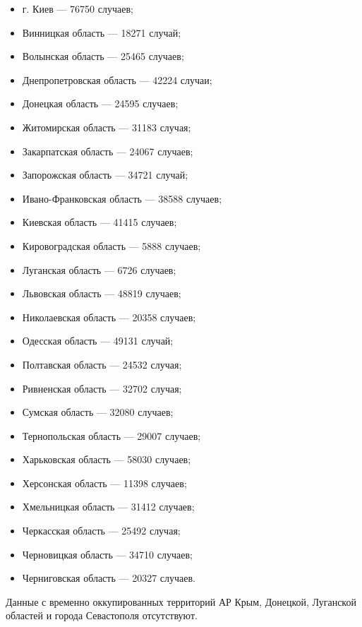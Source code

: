 \begin{itemize}
  \item г. Киев --- 76750 случаев;
  \item Винницкая область --- 18271 случай;
  \item Волынская область --- 25465 случаев;
  \item Днепропетровская область --- 42224 случаи;
  \item Донецкая область --- 24595 случаев;
  \item Житомирская область --- 31183 случая;
  \item Закарпатская область --- 24067 случаев;
  \item Запорожская область --- 34721 случай;
  \item Ивано-Франковская область --- 38588 случаев;
  \item Киевская область --- 41415 случаев;
  \item Кировоградская область --- 5888 случаев;
  \item Луганская область --- 6726 случаев;
  \item Львовская область --- 48819 случаев;
  \item Николаевская область --- 20358 случаев;
  \item Одесская область --- 49131 случай;
  \item Полтавская область --- 24532 случая;
  \item Ривненская область --- 32702 случая;
  \item Сумская область --- 32080 случаев;
  \item Тернопольская область --- 29007 случаев;
  \item Харьковская область --- 58030 случаев;
  \item Херсонская область --- 11398 случаев;
  \item Хмельницкая область --- 31412 случаев;
  \item Черкасская область --- 25492 случая;
  \item Черновицкая область --- 34710 случаев;
  \item Черниговская область --- 20327 случаев.
\end{itemize}

Данные с временно оккупированных территорий АР Крым, Донецкой, Луганской
областей и города Севастополя отсутствуют.
